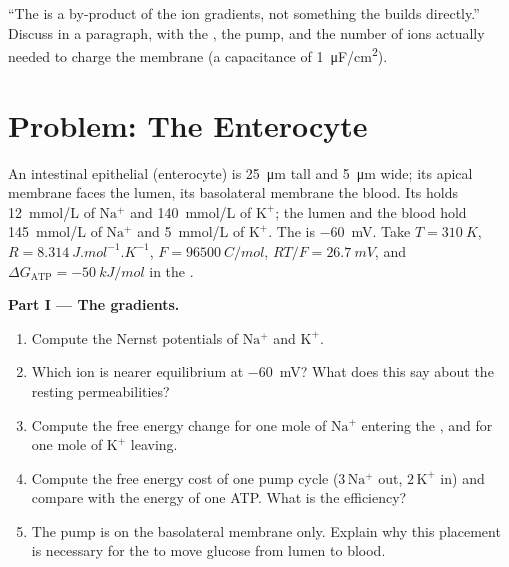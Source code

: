 \begin{exercise}[$\star\star\star$]\label{exo:b1:membranes-transport:12}
``The  is a by-product of the ion gradients, not
something the  builds directly.'' Discuss in a paragraph, with the
, the pump, and the number of ions actually needed to
charge the membrane (a capacitance of \qty{1}{\micro F/cm^2}).
\end{exercise}

\section{Problem: The Enterocyte}

\begin{problem}
\label{pb:b1:membranes-transport:1}
An intestinal epithelial  (enterocyte) is \qty{25}{\micro m} tall
and \qty{5}{\micro m} wide; its apical membrane faces the lumen, its
basolateral membrane the blood. Its  holds \qty{12}{mmol/L} of
$\mathrm{Na^+}$ and \qty{140}{mmol/L} of $\mathrm{K^+}$; the lumen and
the blood hold \qty{145}{mmol/L} of $\mathrm{Na^+}$ and \qty{5}{mmol/L}
of $\mathrm{K^+}$. The  is \qty{-60}{mV}. Take
$T = \qty{310}{K}$, $R = \qty{8.314}{J.mol^{-1}.K^{-1}}$,
$F = \qty{96500}{C/mol}$, $RT/F = \qty{26.7}{mV}$, and
$\Delta G_{\text{ATP}} = \qty{-50}{kJ/mol}$ in the .

\medskip
\noindent\textbf{Part I --- The gradients.}
\begin{enumerate}
  \item Compute the Nernst potentials of $\mathrm{Na^+}$ and
        $\mathrm{K^+}$.
  \item Which ion is nearer equilibrium at \qty{-60}{mV}? What does
        this say about the resting permeabilities?
  \item Compute the free energy change for one mole of $\mathrm{Na^+}$
        entering the , and for one mole of $\mathrm{K^+}$ leaving.
  \item Compute the free energy cost of one pump cycle ($3\,\mathrm{Na^+}$
        out, $2\,\mathrm{K^+}$ in) and compare with the energy of one
        ATP. What is the efficiency?
  \item The pump is on the basolateral membrane only. Explain why this
        placement is necessary for the  to move glucose from lumen
        to blood.
\end{enumerate}


\end{problem}
